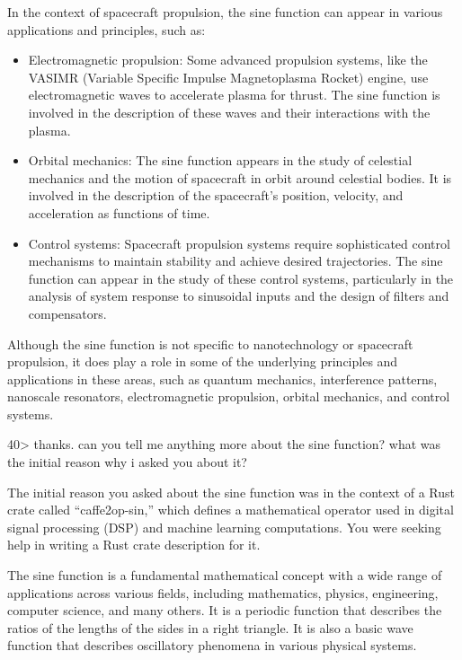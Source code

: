 \documentclass[
]{article}
\begin{document}
In the context of spacecraft propulsion, the sine function can appear in
various applications and principles, such as:

\begin{itemize}
\item
  Electromagnetic propulsion: Some advanced propulsion systems, like the
  VASIMR (Variable Specific Impulse Magnetoplasma Rocket) engine, use
  electromagnetic waves to accelerate plasma for thrust. The sine
  function is involved in the description of these waves and their
  interactions with the plasma.
\item
  Orbital mechanics: The sine function appears in the study of celestial
  mechanics and the motion of spacecraft in orbit around celestial
  bodies. It is involved in the description of the spacecraft's
  position, velocity, and acceleration as functions of time.
\item
  Control systems: Spacecraft propulsion systems require sophisticated
  control mechanisms to maintain stability and achieve desired
  trajectories. The sine function can appear in the study of these
  control systems, particularly in the analysis of system response to
  sinusoidal inputs and the design of filters and compensators.
\end{itemize}

Although the sine function is not specific to nanotechnology or
spacecraft propulsion, it does play a role in some of the underlying
principles and applications in these areas, such as quantum mechanics,
interference patterns, nanoscale resonators, electromagnetic propulsion,
orbital mechanics, and control systems.

40\textgreater{} thanks. can you tell me anything more about the sine
function? what was the initial reason why i asked you about it?

The initial reason you asked about the sine function was in the context
of a Rust crate called ``caffe2op-sin,'' which defines a mathematical
operator used in digital signal processing (DSP) and machine learning
computations. You were seeking help in writing a Rust crate description
for it.

The sine function is a fundamental mathematical concept with a wide
range of applications across various fields, including mathematics,
physics, engineering, computer science, and many others. It is a
periodic function that describes the ratios of the lengths of the sides
in a right triangle. It is also a basic wave function that describes
oscillatory phenomena in various physical systems.
\end{document}
